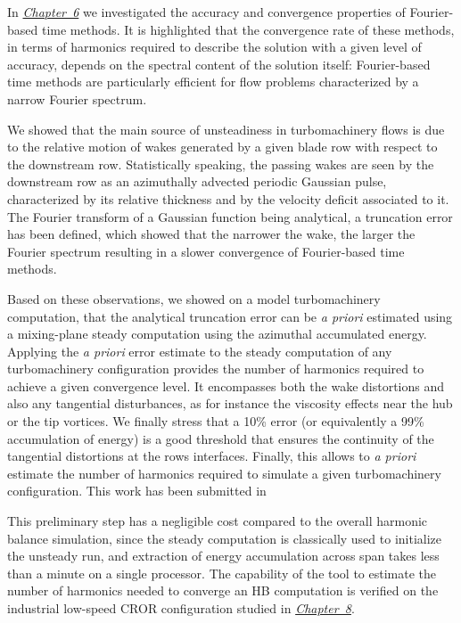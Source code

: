 In \hyperref[cha:limitations_convergence]{\emph{Chapter~6}}
we investigated the accuracy and convergence properties 
of Fourier-based time methods. It is highlighted that the convergence rate 
of these methods, in terms of harmonics required to describe the solution 
with a given level of accuracy, depends on the spectral content of the 
solution itself: Fourier-based time methods are particularly efficient 
for flow problems characterized by a narrow Fourier 
spectrum. 

We showed that the main source of unsteadiness in 
turbomachinery flows is due to the relative motion of wakes 
generated by a given blade row with respect to the downstream row.
Statistically speaking, the passing wakes are seen by the downstream 
row as an azimuthally advected periodic Gaussian pulse, 
characterized by its relative thickness
and by the velocity deficit associated to it.
The Fourier transform of a Gaussian function being analytical,
a truncation error has been defined, which showed that the narrower the wake, 
the larger the Fourier spectrum resulting in a slower convergence 
of Fourier-based time methods.

Based on these observations,
we showed on a model turbomachinery computation, that
the analytical truncation error can be \emph{a priori} 
estimated using a mixing-plane steady computation
using the azimuthal accumulated energy.
Applying the \emph{a priori} error estimate to 
the steady computation of any turbomachinery configuration
provides the number of harmonics required 
to achieve a given convergence level.
It encompasses both the wake distortions and also
any tangential disturbances, as for instance
the viscosity effects near the hub or the tip vortices.
We finally stress that a 10\% error (or equivalently 
a 99\% accumulation of energy) is a good threshold
that ensures the continuity of the tangential distortions at the rows
interfaces. Finally, this allows to \emph{a priori}
estimate the number of harmonics required to simulate
a given turbomachinery configuration.
This work has been submitted in
\begin{quote}
\end{quote}

This preliminary step has a negligible cost compared to the overall harmonic balance
simulation, since the steady computation is classically used to initialize 
the unsteady run, and extraction of energy accumulation across span takes 
less than a minute on a single processor. The capability of the
tool to estimate the number of harmonics needed
to converge an HB computation is verified on the industrial low-speed CROR configuration
studied in \hyperref[cha:dream_ls_isolated]{\emph{Chapter~8}}.

